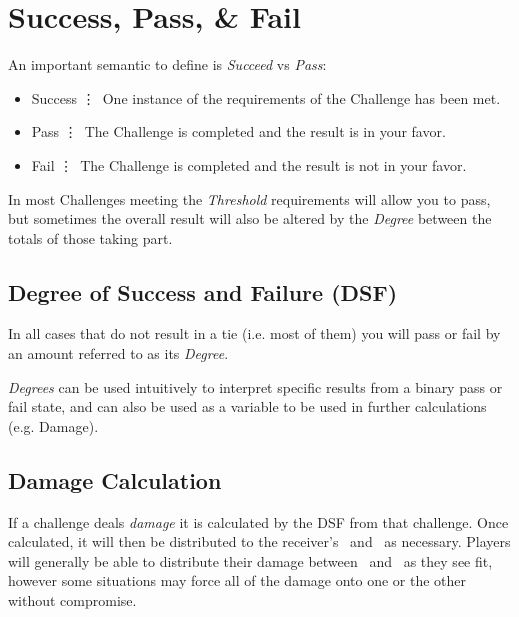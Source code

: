 \section{Success, Pass, \& Fail}\label{sec:success}
An important semantic to define is \emph{Succeed} vs \emph{Pass}:

\begin{itemize}
\item Success \vdots\ One instance of the requirements of the Challenge has been met.
\item Pass \vdots\ The Challenge is completed and the result is in your favor.
\item Fail \vdots\ The Challenge is completed and the result is not in your favor.
\end{itemize}
In most Challenges meeting the \emph{Threshold} requirements will allow you to pass, but sometimes the overall result will also be altered by the \emph{Degree} between the totals of those taking part.   



\subsection{Degree of Success and Failure (DSF)}\label{subsec:dsf}
In all cases that do not result in a tie (i.e. most of them) you will
pass or fail by an amount referred to as its \emph{Degree}. 


\emph{Degrees} can be used intuitively to interpret specific results from
a binary pass or fail state, and can also be used as a variable to be used in further calculations
(e.g. Damage).

\subsection{Damage Calculation}\label{subsec:damage_calc}
If a challenge deals \emph{damage} it is calculated by the DSF from that challenge. Once calculated, it will then be distributed to the receiver's \HPful\ and \ENful\ as necessary. Players will generally be able to distribute their damage between \HPful\ and \ENful\ as they see fit, however some situations may force all of the damage onto one or the other without compromise. 

